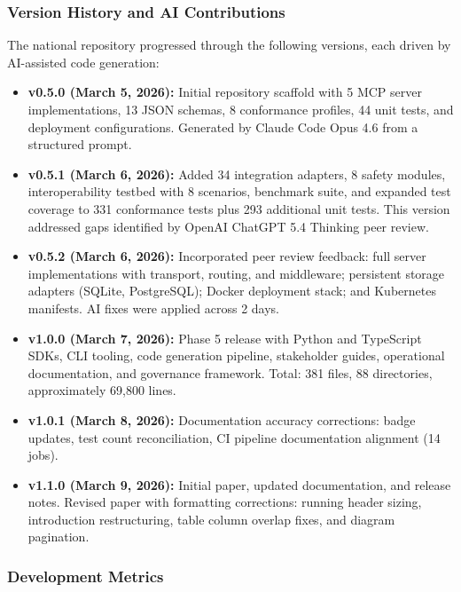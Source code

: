 \subsubsection{Version History and AI Contributions}

The national repository progressed through the following versions, each driven by AI-assisted code generation:

\begin{itemize}[leftmargin=*]
\item \textbf{v0.5.0 (March 5, 2026):} Initial repository scaffold with 5 MCP server implementations, 13 JSON schemas, 8 conformance profiles, 44 unit tests, and deployment configurations. Generated by Claude Code Opus 4.6 from a structured prompt.

\item \textbf{v0.5.1 (March 6, 2026):} Added 34 integration adapters, 8 safety modules, interoperability testbed with 8 scenarios, benchmark suite, and expanded test coverage to 331 conformance tests plus 293 additional unit tests. This version addressed gaps identified by OpenAI ChatGPT 5.4 Thinking peer review.

\item \textbf{v0.5.2 (March 6, 2026):} Incorporated peer review feedback: full server implementations with transport, routing, and middleware; persistent storage adapters (SQLite, PostgreSQL); Docker deployment stack; and Kubernetes manifests. AI fixes were applied across 2 days.

\item \textbf{v1.0.0 (March 7, 2026):} Phase 5 release with Python and TypeScript SDKs, CLI tooling, code generation pipeline, stakeholder guides, operational documentation, and governance framework. Total: 381 files, 88 directories, approximately 69,800 lines.

\item \textbf{v1.0.1 (March 8, 2026):} Documentation accuracy corrections: badge updates, test count reconciliation, CI pipeline documentation alignment (14 jobs).

\item \textbf{v1.1.0 (March 9, 2026):} Initial paper, updated documentation, and release notes. Revised paper with formatting corrections: running header sizing, introduction restructuring, table column overlap fixes, and diagram pagination.
\end{itemize}

\subsubsection{Development Metrics}

